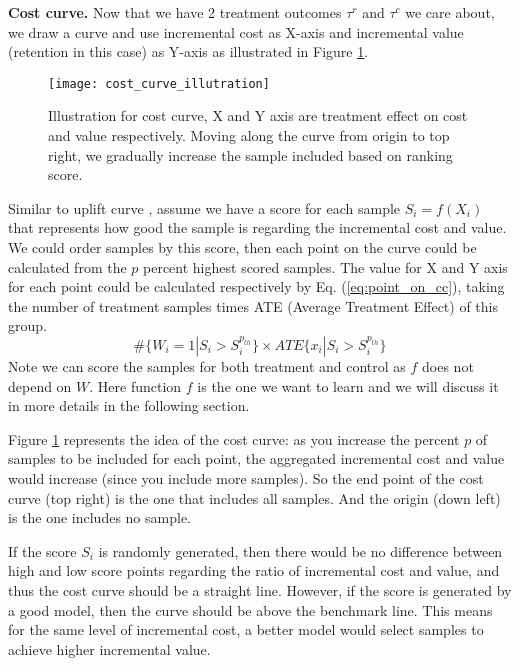 \textbf{Cost curve.} Now that we have 2 treatment outcomes $\tau^r$ and $\tau^c$ we care about, we draw a curve and use incremental cost as X-axis and incremental value (retention in this case) as Y-axis as illustrated in Figure \ref{fig:cost_curve_illustration}. 
\begin{figure}
\texttt{[image: cost\_curve\_illutration]}
\caption{Illustration for cost curve, X and Y axis are treatment effect on cost and value respectively. Moving along the curve from origin to top right, we gradually increase the sample included based on ranking score.}
\label{fig:cost_curve_illustration}
\end{figure}
Similar to uplift curve \cite{rzepakowski2012decision}, assume we have a score for each sample $S_i=f(X_i)$ that represents how good the sample is regarding the incremental cost and value. We could order samples by this score, then each point on the curve could be calculated from the $p$ percent highest scored samples. The value for X and Y axis for each point could be calculated respectively by Eq. (\ref{eq:point_on_cc}), taking the number of treatment samples times ATE (Average Treatment Effect) of this group.
\begin{equation}
  \label{eq:point_on_cc}
  \#\{W_i=1|S_i>S^{p_{th}}_i\} \times ATE\{x_i|S_i>S^{p_{th}}_i\}
\end{equation}
Note we can score the samples for both treatment and control as $f$ does not depend on $W$. Here function $f$ is the one we want to learn and we will discuss it in more details in the following section.

Figure \ref{fig:cost_curve_illustration} represents the idea of the cost curve: as you increase the percent $p$ of samples to be included for each point, the aggregated incremental cost and value would increase (since you include more samples). So the end point of the cost curve (top right) is the one that includes all samples. And the origin (down left) is the one includes no sample.

If the score $S_i$ is randomly generated, then there would be no difference between high and low score points regarding the ratio of incremental cost and value, and thus the cost curve should be a straight line. However, if the score is generated by a good model, then the curve should be above the benchmark line. This means for the same level of incremental cost, a better model would select samples to achieve higher incremental value.

